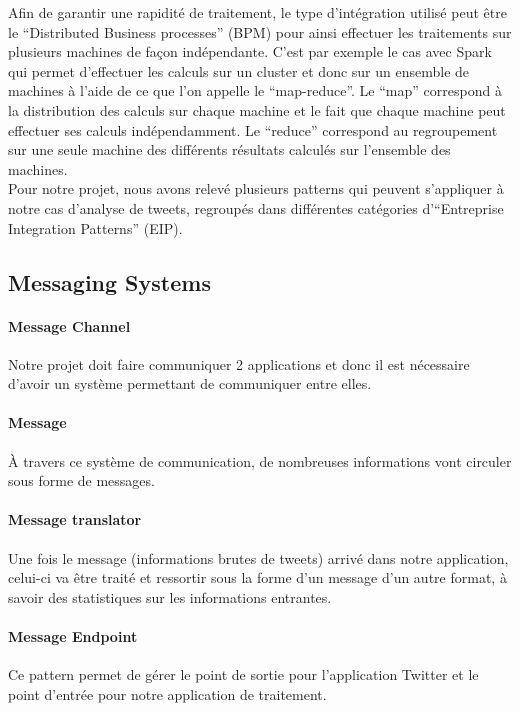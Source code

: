   Afin de garantir une rapidité de traitement, le type d'intégration utilisé peut être le ``Distributed Business processes'' (BPM) pour ainsi effectuer les traitements sur plusieurs machines de façon indépendante. C'est par exemple le cas avec Spark qui permet d'effectuer les calculs sur un cluster et donc sur un ensemble de machines à l'aide de ce que l'on appelle le ``map-reduce''. Le ``map'' correspond à la distribution des calculs sur chaque machine et le fait que chaque machine peut effectuer ses calculs indépendamment. Le ``reduce'' correspond au regroupement sur une seule machine des différents résultats calculés sur l'ensemble des machines. \\

  Pour notre projet, nous avons relevé plusieurs patterns qui peuvent s'appliquer à notre cas d'analyse de tweets, regroupés dans différentes catégories d'``Entreprise Integration Patterns'' (EIP).

  \subsection{Messaging Systems}
    \paragraph{Message Channel} Notre projet doit faire communiquer 2 applications et donc il est nécessaire d'avoir un système permettant de communiquer entre elles.

    \paragraph{Message} À travers ce système de communication, de nombreuses informations vont circuler sous forme de messages.

    \paragraph{Message translator} Une fois le message (informations brutes de tweets) arrivé dans notre application, celui-ci va être traité et ressortir sous la forme d'un message d'un autre format, à savoir des statistiques sur les informations entrantes.

    \paragraph{Message Endpoint} Ce pattern permet de gérer le point de sortie pour l'application Twitter et le point d'entrée pour notre application de traitement.

